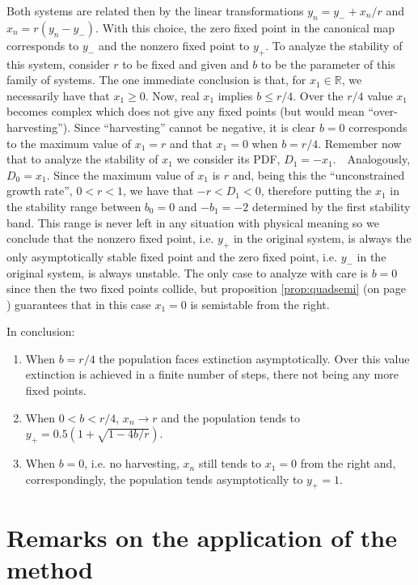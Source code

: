 \documentclass[10pt,twoside,titlepage]{book}
\numberwithin{equation}{chapter}
\numberwithin{figure}{chapter}
\numberwithin{table}{chapter}
\theoremstyle{plain}%
\theoremstyle{definition}
\theoremstyle{remark}
\begin{document}
Both systems are related then by the linear transformations $y_n=y_-+x_n/r$ and $x_n=r(y_n-y_-)$. With this choice, the zero fixed point in the canonical map corresponds to $y_-$ and the nonzero fixed point to $y_+$. To analyze the stability of this system, consider $r$ to be fixed and given and $b$ to be the parameter of this family of systems. The one immediate conclusion is that, for $x_1\in\mathbb{R}$, we necessarily have that $x_1\geq0$. Now, real $x_1$ implies $b\leq r/4$. Over the $r/4$ value $x_1$ becomes complex which does not give any fixed points (but would mean ``over-harvesting''). Since ``harvesting'' cannot be negative, it is clear $b=0$ corresponds to the maximum value of $x_1=r$ and that $x_1=0$ when $b=r/4$. Remember now that to analyze the stability of $x_1$ we consider its PDF, $D_1=-x_1$.　Analogously, $D_0=x_1$. Since the maximum value of $x_1$ is $r$ and, being this the ``unconstrained growth rate'', $0<r<1$, we have that $-r<D_1<0$, therefore putting the $x_1$ in the stability range between $b_0=0$ and $-b_1=-2$ determined by the first stability band. This range is never left in any situation with physical meaning so we conclude that the nonzero fixed point, i.e. $y_+$ in the original system, is always the only asymptotically stable fixed point and the zero fixed point, i.e. $y_-$ in the original system, is always unstable. The only case to analyze with care is $b=0$ since then the two fixed points collide, but proposition \ref{prop:quadsemi} (on page \pageref{prop:quadsemi}) guarantees that in this case $x_1=0$ is semistable from the right.

In conclusion:
\begin{enumerate}
	\item When $b=r/4$ the population faces extinction asymptotically. Over this value extinction is achieved in a finite number of steps, there not being any more fixed points.
	\item When $0<b<r/4$, $x_n\rightarrow r$ and the population tends to $y_+=0.5(1+\sqrt{1-4b/r})$.
	\item When $b=0$, i.e. no harvesting, $x_n$ still tends to $x_1=0$ from the right and, correspondingly, the population tends asymptotically to $y_+=1$.
\end{enumerate}

\section{Remarks on the application of the method}
\end{document}
